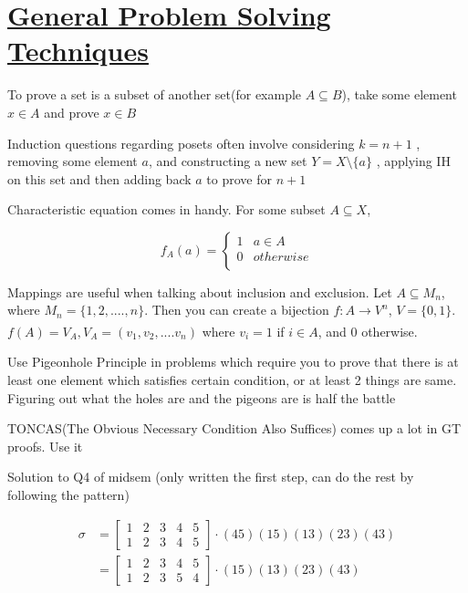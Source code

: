\documentclass{article}
\theoremstyle{definition}
\theoremstyle{definition}
\theoremstyle{named}
\begin{document}
\section{\underline{General Problem Solving Techniques}}
\begin{citemize}
\item To prove a set is a subset of another set(for example $A \subseteq B$), take some element $x \in A$ and prove $x \in B$ 
\item Induction questions regarding posets often involve considering $k=n+1$ , removing some element $a$, and constructing a new set $Y = X \setminus  \{a\}$ , applying IH on this set and then adding back $a$ to prove for $n+1$
\item  Characteristic equation comes in handy. For some subset $A \subseteq X$, 


\[
f_A(a) =\left\{
\begin{array}{ll}
      1 & a \in  A\\
      0 & otherwise \\
\end{array} 
\right.
        \]

\item Mappings are useful when talking about inclusion and exclusion. Let $A \subseteq M_n$, where $M_n = \{1, 2, ...., n\}$. Then you can create a bijection $f:A \xrightarrow[]{} V^{n}$, $V = \{0, 1\}$. $f(A) = V_A, V_A = (v_1, v_2, .... v_n)$ where $v_i = 1$ if $i \in A$, and 0 otherwise. 

\item Use Pigeonhole Principle in problems which require you to prove that there is at least one element which satisfies certain condition, or at least 2 things are same. Figuring out what the holes are and the pigeons are is half the battle 

\item TONCAS(The Obvious Necessary Condition Also Suffices) comes up a lot in GT proofs. Use it

\item Solution to Q4 of midsem (only written the first step, can do the rest by following the pattern)

\[
\begin{aligned}
\sigma  &= \begin{bmatrix}
1 & 2 & 3 & 4 & 5 \\
1 & 2 & 3 & 4 & 5 
\end{bmatrix}  \cdot (45)(15)(13)(23)(43) \\  
&= \begin{bmatrix}
1 & 2 & 3 & 4 & 5 \\
1 & 2 & 3 & 5 & 4 
\end{bmatrix}  \cdot (15)(13)(23)(43) \\
\end{aligned}
\]

\end{citemize}
\end{document}
